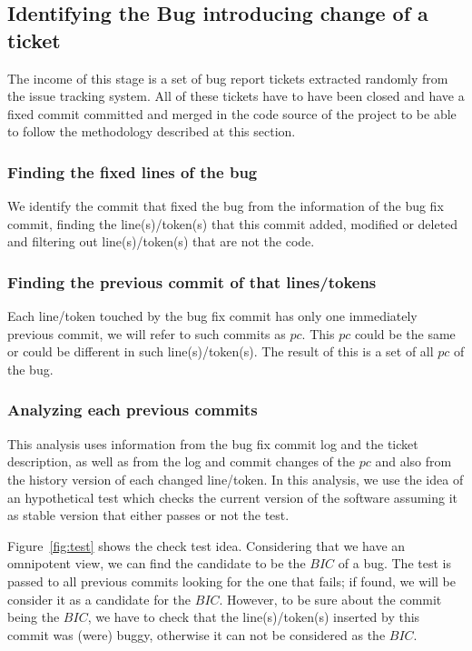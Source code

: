 \documentclass[10pt, conference]{IEEEtran}
\begin{document}
\subsection{Identifying the Bug introducing change of a ticket}
\label{sec:methodologySS}
The income of this stage is a set of bug report tickets extracted randomly from the issue tracking system. All of these tickets have to have been closed and have a fixed commit committed and merged in the code source of the project to be able to follow the methodology described at this section.

\subsubsection{Finding the fixed lines of the bug}
We identify the commit that fixed the bug from the information of the bug fix commit, finding the line(s)/token(s) that this commit added, modified or deleted and filtering out line(s)/token(s) that are not the code.
	
\subsubsection{Finding the previous commit of that lines/tokens}

Each line/token touched by the bug fix commit has only one immediately previous commit, we will refer to such commits as $pc$. This $pc$ could be the same or could be different in such line(s)/token(s). The result of this is a set of all $pc$ of the bug.

\subsubsection{Analyzing each previous commits }

This analysis uses information from the bug fix commit log and the ticket description, as well as from the log and commit changes of the $pc$ and also from the history version of each changed line/token. In this analysis, we use the idea of an hypothetical test which checks the current version of the software assuming it as stable version that either passes or not the test.

Figure~\ref{fig:test} shows the check test idea. Considering that we have an omnipotent view, we can find the candidate to be the $BIC$ of a bug. The test is passed to all previous commits looking for the one that fails; if found, we will be consider it as a candidate for the $BIC$. However, to be sure about the commit being the $BIC$, we have to check that the line(s)/token(s) inserted by this commit was (were) buggy, otherwise it can not be considered as the $BIC$.
\end{document}
